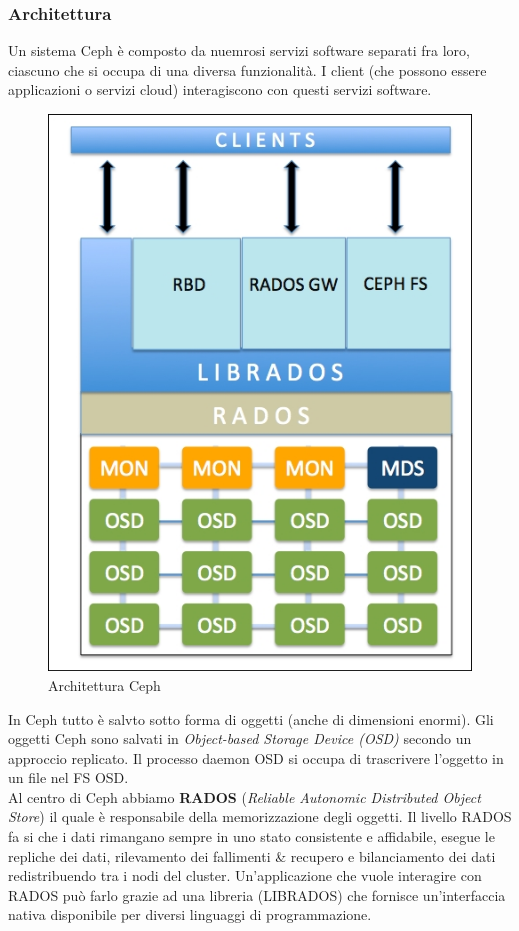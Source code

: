 \documentclass{article}
\begin{document}
\subsubsection{Architettura}
Un sistema Ceph è composto da nuemrosi servizi software separati fra loro, ciascuno che si occupa di una diversa funzionalità. I client (che possono essere applicazioni o servizi cloud) interagiscono con questi servizi software.
\begin{figure}[H]
    \centering
    \includegraphics[scale=0.3]{img/ceph.jpg}
    \caption{Architettura Ceph}
\end{figure}\noindent
In Ceph tutto è salvto sotto forma di oggetti (anche di dimensioni enormi). Gli oggetti Ceph sono salvati in \textit{Object-based Storage Device (OSD)} secondo un approccio replicato. Il processo daemon OSD si occupa di trascrivere l'oggetto in un file nel FS OSD.\\
Al centro di Ceph abbiamo \textbf{RADOS} (\textit{Reliable Autonomic Distributed Object Store}) il quale è responsabile della memorizzazione degli oggetti. Il livello RADOS fa si che i dati rimangano sempre in uno stato consistente e affidabile, esegue le repliche dei dati, rilevamento dei fallimenti \& recupero e bilanciamento dei dati redistribuendo tra i nodi del cluster. Un'applicazione che vuole interagire con RADOS può farlo grazie ad una libreria (LIBRADOS) che fornisce un'interfaccia nativa disponibile per diversi linguaggi di programmazione.\\
\end{document}
